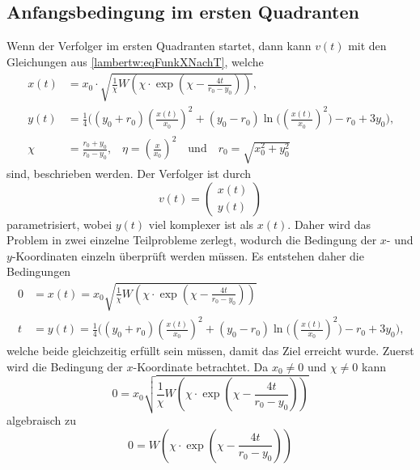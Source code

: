 \subsection{Anfangsbedingung im ersten Quadranten}
%
Wenn der Verfolger im ersten Quadranten startet, dann kann $v(t)$ mit den Gleichungen aus \eqref{lambertw:eqFunkXNachT}, welche
\begin{align}
    x\left(t\right)
    &=
    x_0\cdot\sqrt{\frac{1}{\chi}W\left(\chi\cdot \exp\left( \chi-\frac{4t}{r_0-y_0}\right) \right)} \text{,}\\
    y(t)
    &=
    \frac{1}{4}\biggl(\left(y_0+r_0\right)\left(\frac{x(t)}{x_0}\right)^2+\left(y_0-r_0\right)\operatorname{ln}\biggl(\left(\frac{x(t)}{x_0}\right)^2\biggr)-r_0+3y_0\biggr) \text{,}\\
    \chi
    &=
    \frac{r_0+y_0}{r_0-y_0}\text{,} \quad
    \eta
    =
    \left(\frac{x}{x_0}\right)^2 \quad\text{und}\quad
    r_0
    =
    \sqrt{x_0^2+y_0^2}
\end{align}
%
sind,
beschrieben werden.
Der Verfolger ist durch
\begin{equation}
    v(t)
    =
    \left( \begin{array}{c} x(t) \\ y(t) \end{array} \right)
\end{equation}
%
parametrisiert, wobei $y(t)$ viel komplexer ist als $x(t)$.
Daher wird das Problem in zwei einzelne Teilprobleme zerlegt, wodurch die Bedingung der $x$- und $y$-Koordinaten einzeln überprüft werden müssen. Es entstehen daher die Bedingungen
%
\begin{align}
    0
    &=
    x(t)
    =
    x_0\sqrt{\frac{1}{\chi}W\left(\chi\cdot \exp\left( \chi-\frac{4t}{r_0-y_0}\right)\right)}
    \\
    t
    &=
    y(t)
    =
    \frac{1}{4}\biggl(\left(y_0+r_0\right)\left(\frac{x(t)}{x_0}\right)^2+\left(y_0-r_0\right)\operatorname{ln}\biggl(\left(\frac{x(t)}{x_0}\right)^2\biggr)-r_0+3y_0\biggr)
    \text{,}
\end{align}
%
welche beide gleichzeitig erfüllt sein müssen, damit das Ziel erreicht wurde.
Zuerst wird die Bedingung der $x$-Koordinate betrachtet.
Da $x_0 \neq 0$ und $\chi \neq 0$ kann
\begin{equation}
    0
    =
    x_0\sqrt{\frac{1}{\chi}W\left(\chi\cdot \exp\left( \chi-\frac{4t}{r_0-y_0}\right)\right)}
\end{equation}
algebraisch zu
\begin{equation}
    0
    =
    W\left(\chi\cdot \exp\left( \chi-\frac{4t}{r_0-y_0}\right)\right)
\end{equation}
